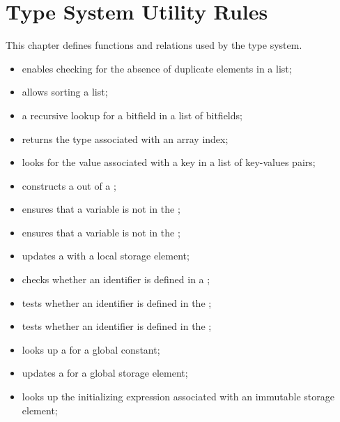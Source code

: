 \chapter{Type System Utility Rules\label{chap:TypeSystemUtilityRules}}

This chapter defines functions and relations used by the type system.

\ChapterOutline
\begin{itemize}
  \item {} enables checking for the absence of duplicate elements in a list;
  \item {} allows sorting a list;
  \item {} a recursive lookup for a bitfield in a list of bitfields;
  \item {} returns the type associated with an array index;
  \item {} looks for the value associated with a key in a list of key-values pairs;
  \item {} constructs a \staticenvironmentterm{} out of a \globalstaticenvironmentterm;
  \item {} ensures that a variable is not in the \staticenvironmentterm{};
  \item {} ensures that a variable is not in the \globalstaticenvironmentterm;
  \item {} updates a \staticenvironmentterm{} with a local storage element;
  \item {} checks whether an identifier is defined in a \staticenvironmentterm{};
  \item {} tests whether an identifier is defined in the \globalstaticenvironmentterm;
  \item {} tests whether an identifier is defined in the \localstaticenvironmentterm;
  \item {} looks up a \staticenvironmentterm{} for a global constant;
  \item {} updates a \staticenvironmentterm{} for a global storage element;
  \item {} looks up the initializing expression associated with an immutable storage element;

\end{itemize}
